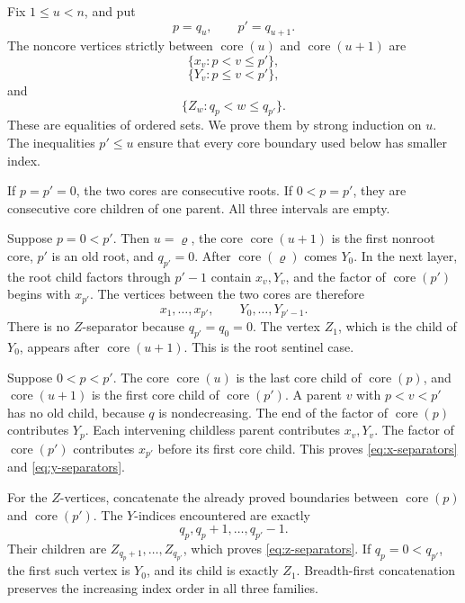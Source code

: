 \documentclass[11pt]{article}
\theoremstyle{definition}
\theoremstyle{remark}
\begin{document}
Fix \(1\leq u<n\), and put
\[
 p=q_u,
 \qquad p'=q_{u+1}.
\]
The noncore vertices strictly between \(\operatorname{core}(u)\) and \(\operatorname{core}(u+1)\) are
\begin{equation}
\label{eq:x-separators}
 \{x_v:p<v\leq p'\},
\end{equation}
\begin{equation}
\label{eq:y-separators}
 \{Y_v:p\leq v<p'\},
\end{equation}
and
\begin{equation}
\label{eq:z-separators}
 \{Z_w:q_p<w\leq q_{p'}\}.
\end{equation}
These are equalities of ordered sets.  We prove them by strong induction on
\(u\).  The inequalities \(p'\leq u\) ensure that every core boundary used
below has smaller index.

If \(p=p'=0\), the two cores are consecutive roots.  If \(0<p=p'\), they are
consecutive core children of one parent.  All three intervals are empty.

Suppose \(p=0<p'\).  Then \(u=\varrho\), the core \(\operatorname{core}(u+1)\) is the first
nonroot core, \(p'\) is an old root, and \(q_{p'}=0\).  After
\(\operatorname{core}(\varrho)\) comes \(Y_0\).  In the next layer, the root child factors
through \(p'-1\) contain \(x_v,Y_v\), and the factor of \(\operatorname{core}(p')\) begins
with \(x_{p'}\).  The vertices between the two cores are therefore
\[
 x_1,\ldots,x_{p'},
 \qquad
 Y_0,\ldots,Y_{p'-1}.
\]
There is no \(Z\)-separator because \(q_{p'}=q_0=0\).  The vertex \(Z_1\),
which is the child of \(Y_0\), appears after \(\operatorname{core}(u+1)\).  This is the root
sentinel case.

Suppose \(0<p<p'\).  The core \(\operatorname{core}(u)\) is the last core child of \(\operatorname{core}(p)\),
and \(\operatorname{core}(u+1)\) is the first core child of \(\operatorname{core}(p')\).  A parent \(v\) with
\(p<v<p'\) has no old child, because \(q\) is nondecreasing.  The end of the
factor of \(\operatorname{core}(p)\) contributes \(Y_p\).  Each intervening childless parent
contributes \(x_v,Y_v\).  The factor of \(\operatorname{core}(p')\) contributes \(x_{p'}\)
before its first core child.  This proves \eqref{eq:x-separators} and
\eqref{eq:y-separators}.

For the \(Z\)-vertices, concatenate the already proved boundaries between
\(\operatorname{core}(p)\) and \(\operatorname{core}(p')\).  The \(Y\)-indices encountered are exactly
\[
 q_p,q_p+1,\ldots,q_{p'}-1.
\]
Their children are \(Z_{q_p+1},\ldots,Z_{q_{p'}}\), which proves
\eqref{eq:z-separators}.  If \(q_p=0<q_{p'}\), the first such vertex is
\(Y_0\), and its child is exactly \(Z_1\).  Breadth-first concatenation
preserves the increasing index order in all three families.
\end{document}
